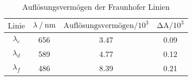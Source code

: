 \begin{table}[H]
  \centering
  \caption{Auflösungsvermögen der Fraunhofer Linien}
  \label{tab:tabe4}
    \begin{tabular}{S S S S}
    \toprule
    $ \text{Linie} $ & $ \lambda \: / \: \text{nm} $ & $ \text{Auflösungsvermögen} / \text{10}^{3} $
    & $ \increment \text{A} / \text{10}^{3} $ \\
    \midrule
    $\lambda_{c}$ & 656 & 3.47 & 0.09 \\
    $\lambda_{d}$ & 589 & 4.77 & 0.12 \\
    $\lambda_{f}$ & 486 & 8.39 & 0.21 \\

          \bottomrule
    \end{tabular}
  \end{table}
